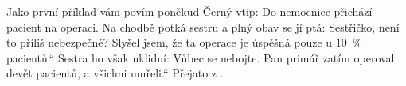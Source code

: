 \begin{mdframed}[style=mdexam]
  \begin{example}\label{mai:exam102}
    Jako první příklad vám povím poněkud Černý vtip: \newline
    Do nemocnice přichází pacient na operaci. Na chodbě potká sestru a plný obav se jí ptá:
    Sestřičko, není to příliš nebezpečné? Slyšel jsem, že ta operace je úspěšná pouze u
    \SI{10}{\percent} pacientů.“ Sestra ho však uklidní: Vůbec se nebojte. Pan primář zatím operoval
    devět pacientů, a všichni umřeli.“ Přejato z \cite[s.~9]{Rogalewicz2007}.
  \end{example}
\end{mdframed}